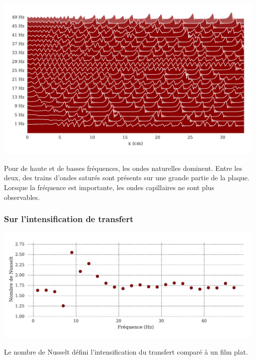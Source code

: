 \documentclass[a0,portrait]{a0poster}
\begin{document}
\begin{multicols}{2}
\begin{multicols}{2}
        \begin{center}
            \includegraphics[width=0.98\columnwidth]{01-frequency_effect}
            \label{fig:freq_effect}
        \end{center}

        Pour de haute et de basses fréquences, les ondes naturelles dominent. Entre les deux, des trains d'ondes saturés sont présents sur une grande partie de la plaque. Lorsque la fréquence est importante, les ondes capillaires ne sont plus observables.

        \columnbreak

        \subsubsection*{Sur l'intensification de transfert}

        \begin{center}
            \includegraphics[width=0.98\columnwidth]{01-Nusselt_freq}
            \label{fig:freq_effect_Nu}
        \end{center}
        Le nombre de Nusselt défini l'intensification du transfert comparé à un film plat.


\end{multicols}
\end{multicols}
\end{document}
